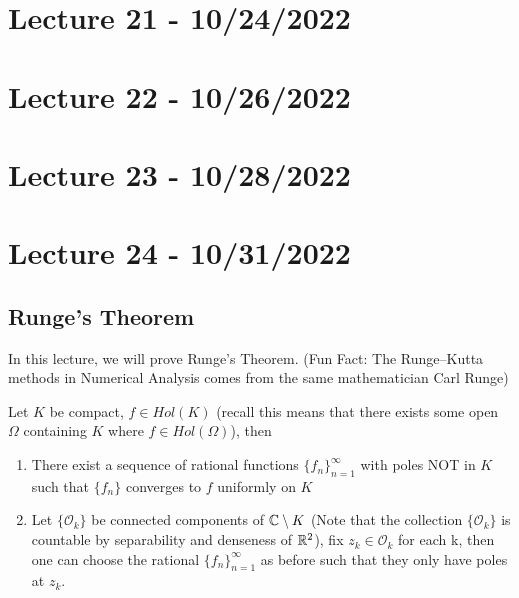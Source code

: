 \documentclass{article}
\begin{document}
\section{Lecture 21 - 10/24/2022}

\section{Lecture 22 - 10/26/2022}

\section{Lecture 23 - 10/28/2022}

\newpage
\section{Lecture 24 - 10/31/2022}

\subsection{Runge's Theorem}

In this lecture, we will prove Runge's Theorem. (Fun Fact: The Runge–Kutta methods in Numerical Analysis comes from the same mathematician Carl Runge)

\begin{theorem}
    Let $K$ be compact, $f \in Hol(K)$ (recall this means that there exists some open $\Omega$ containing $K$ where $f \in Hol(\Omega)$), then
    \begin{enumerate}
        \item There exist a sequence of rational functions $\{f_n\}_{n = 1}^\infty$ with poles NOT in $K$ such that $\{f_n\}$ converges to $f$ uniformly on $K$
        \item Let $\{\mathcal{O}_k\}$ be connected components of $\mathbb{C} \setminus K$ (Note that the collection $\{\mathcal{O}_k\}$ is countable by separability and denseness of $\mathbb{R}^2$), fix $z_k \in \mathcal{O}_k$ for each k, then one can choose the rational $\{f_n\}_{n = 1}^\infty$ as before such that they only have poles at $z_k$.
    \end{enumerate}
\end{theorem}
\end{document}
